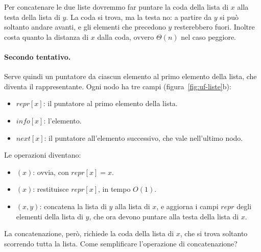 Per concatenare le due liste dovremmo far puntare la coda della lista di $x$ alla testa della lista di $y$. La coda si trova, ma la testa no: a partire da $y$ si può soltanto andare avanti, e gli elementi che precedono $y$ resterebbero fuori. Inoltre \FindSet{} costa quanto la distanza di $x$ dalla coda, ovvero $\Theta(n)$ nel caso peggiore.

\paragraph{Secondo tentativo.}
Serve quindi un puntatore da ciascun elemento al primo elemento della lista, che diventa il rappresentante. Ogni nodo ha tre campi (figura~\ref{fig:uf-liste}b):
\begin{itemize}
    \item $\mathit{repr}[x]$: il puntatore al primo elemento della lista.
    \item $\mathit{info}[x]$: l'elemento.
    \item $\mathit{next}[x]$: il puntatore all'elemento successivo, che vale \Nil{} nell'ultimo nodo.
\end{itemize}

Le operazioni diventano:
\begin{itemize}
    \item \MakeSet$(x)$: ovvia, con $\mathit{repr}[x] = x$.
    \item \FindSet$(x)$: restituisce $\mathit{repr}[x]$, in tempo $O(1)$.
    \item \Union$(x,y)$: concatena la lista di $y$ alla lista di $x$, e aggiorna i campi $\mathit{repr}$ degli elementi della lista di $y$, che ora devono puntare alla testa della lista di $x$.
\end{itemize}

La concatenazione, però, richiede la coda della lista di $x$, che si trova soltanto scorrendo tutta la lista. Come semplificare l'operazione di concatenazione?

